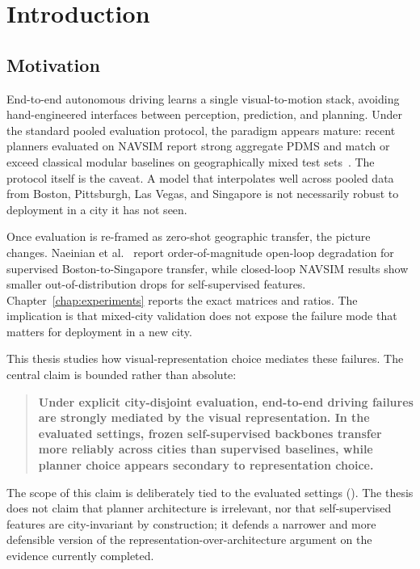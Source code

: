 \chapter{Introduction}
\label{chap:introduction}

\noindent

\section{Motivation}
\label{sec:motivation}

End-to-end autonomous driving learns a single visual-to-motion stack, avoiding hand-engineered interfaces between perception, prediction, and planning. Under the standard pooled evaluation protocol, the paradigm appears mature: recent planners evaluated on NAVSIM report strong aggregate PDMS and match or exceed classical modular baselines on geographically mixed test sets~\cite{dauner-navsim-2024}. The protocol itself is the caveat. A model that interpolates well across pooled data from Boston, Pittsburgh, Las Vegas, and Singapore is not necessarily robust to deployment in a city it has not seen.

Once evaluation is re-framed as zero-shot geographic transfer, the picture changes. Naeinian et al.~\cite{naeinian-cross-city-2026} report order-of-magnitude open-loop degradation for supervised Boston-to-Singapore transfer, while closed-loop NAVSIM results show smaller out-of-distribution drops for self-supervised features. Chapter~\ref{chap:experiments} reports the exact matrices and ratios. The implication is that mixed-city validation does not expose the failure mode that matters for deployment in a new city.

This thesis studies how visual-representation choice mediates these failures. The central claim is bounded rather than absolute:

\begin{quote}
\textbf{Under explicit city-disjoint evaluation, end-to-end driving failures are strongly mediated by the visual representation. In the evaluated settings, frozen self-supervised backbones transfer more reliably across cities than supervised baselines, while planner choice appears secondary to representation choice.}
\end{quote}

\noindent
The scope of this claim is deliberately tied to the evaluated settings (). The thesis does not claim that planner architecture is irrelevant, nor that self-supervised features are city-invariant by construction; it defends a narrower and more defensible version of the representation-over-architecture argument on the evidence currently completed.

